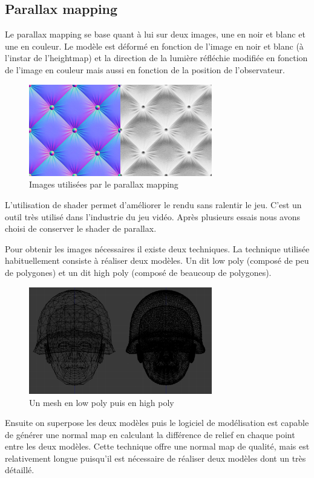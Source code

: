 \documentclass[11pt]{report}
\begin{document}
\subsection{Parallax mapping}

Le parallax mapping se base quant à lui sur deux images, une en noir et blanc et une en couleur. Le modèle est déformé en fonction de l’image en noir et blanc (à l'instar de l’heightmap) et la direction de la lumière réfléchie modifiée en fonction de l’image en couleur mais aussi en fonction de la position de l’observateur.

\begin{figure}[htbp]
\centering
\includegraphics[width=8cm]{parallax.png}
\caption{Images utilisées par le parallax mapping}
\end{figure}

L’utilisation de shader permet d’améliorer le rendu sans ralentir le jeu. C’est un outil très utilisé dans l’industrie du jeu vidéo. Après plusieurs essais nous avons choisi de conserver le shader de parallax.

Pour obtenir les images nécessaires il existe deux techniques. La technique utilisée habituellement consiste à réaliser deux modèles. Un dit low poly (composé de peu de polygones) et un dit high poly (composé de beaucoup de polygones).

\begin{figure}[htbp]
\centering
\includegraphics[width=8cm]{lowpoly_vs_highpoly.png}
\caption{Un mesh en low poly puis en high poly}
\end{figure}

Ensuite on superpose les deux modèles puis le logiciel de modélisation est capable de générer une normal map en calculant la différence de relief en chaque point entre les deux modèles.
Cette technique offre une normal map de qualité, mais est relativement longue puisqu'il est nécessaire de réaliser deux modèles dont un très détaillé.
\end{document}

